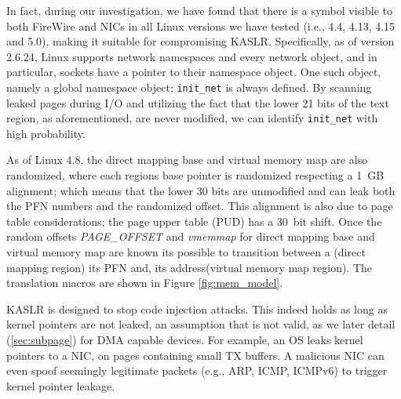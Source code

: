 In fact, during our investigation, we have found that there is a symbol visible to both FireWire and NICs in all Linux versions we have tested (i.e., 4.4, 4.13, 4.15 and 5.0), making it suitable for compromising KASLR. Specifically, as of version 2.6.24, Linux supports network namespaces and every network object, and in particular, sockets have a pointer to their namespace object. One such object, namely a global namespace object; \texttt{init\_net} is always defined. By scanning leaked pages during I/O and utilizing the fact that the lower 21 bits of the text region, as aforementioned, are never modified, we can identify \texttt{init\_net} with high probability.

As of Linux 4.8, the direct mapping base and virtual memory map are also randomized, where each regions base pointer is randomized respecting a 1~GB alignment; which means that the lower 30 bits are unmodified and can leak both the PFN numbers and the randomized offset. This alignment is also due to page table considerations; the page upper table (PUD) has a 30~bit shift. Once the random offsets \textit{PAGE\_OFFSET} and \textit{vmemmap} for direct mapping base and virtual memory map are known its possible to transition between a \kva(direct mapping region) its PFN and, its \page{} address(virtual memory map region). The translation macros are shown in Figure \ref{fig:mem_model}. 

KASLR is designed to stop code injection attacks. This indeed holds as long as kernel pointers are not leaked, an assumption that is not valid, as we later detail (\ref{sec:subpage}) for DMA capable devices. For example, an OS leaks kernel pointers to a NIC, on pages containing small TX buffers. A malicious NIC can even spoof seemingly legitimate packets (e.g., ARP, ICMP, ICMPv6) to trigger kernel pointer leakage.
